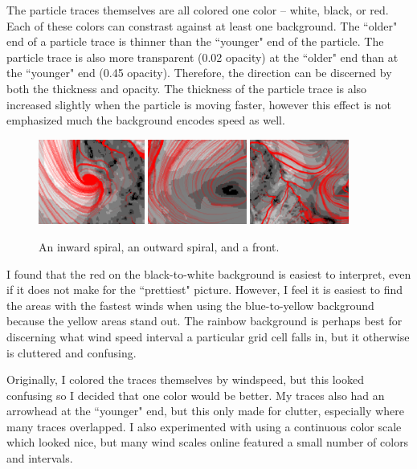 \documentclass{article} %
\begin{document}
The particle traces themselves are all colored one color -- white, black, or red.  Each of these colors can constrast against at least one background.  The ``older" end of a particle trace is thinner than the ``younger" end of the particle.  The particle trace is also more transparent (0.02 opacity) at the ``older" end than at the ``younger" end (0.45 opacity).  Therefore, the direction can be discerned by both the thickness and opacity.  The thickness of the particle trace is also increased slightly when the particle is moving faster, however this effect is not emphasized much the background encodes speed as well.

\begin{figure}[htb]
   \centering
   \includegraphics[height=1.1in]{images/inwardspiral.eps}
   \includegraphics[height=1.1in]{images/outwardspiral.eps}
   \includegraphics[height=1.1in]{images/front.eps}
    \caption{An inward spiral, an outward spiral, and a front.}
   \label{fig:features}
\end{figure}

I found that the red on the black-to-white background is easiest to interpret, even if it does not make for the ``prettiest" picture.  However, I feel it is easiest to find the areas with the fastest winds when using the blue-to-yellow background because the yellow areas stand out.  The rainbow background is perhaps best for discerning what wind speed interval a particular grid cell falls in, but it otherwise is cluttered and confusing.

Originally, I colored the traces themselves by windspeed, but this looked confusing so I decided that one color would be better.  My traces also had an arrowhead at the ``younger" end, but this only made for clutter, especially where many traces overlapped.  I also experimented with using a continuous color scale which looked nice, but many wind scales online featured a small number of colors and intervals.
\end{document}
